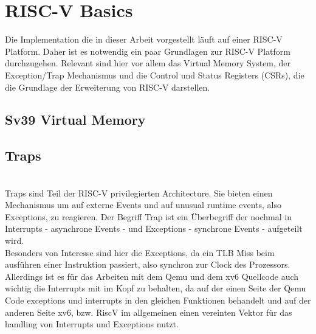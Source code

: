 



\section{RISC-V Basics}
Die Implementation die in dieser Arbeit vorgestellt läuft auf einer RISC-V Platform. Daher ist
es notwendig ein paar Grundlagen zur RISC-V Platform durchzugehen. Relevant sind hier vor allem
das Virtual Memory System, der Exception/Trap Mechanismus und die Control und Status Registers (CSRs), die
die Grundlage der Erweiterung von RISC-V darstellen.

\subsection{Sv39 Virtual Memory}

\subsection{Traps}
\\
Traps sind Teil der RISC-V privilegierten Architecture. Sie bieten einen Mechanismus
um auf externe Events und auf unusual runtime events, also Exceptions, zu reagieren\cite{riscvreader}.
Der Begriff Trap ist ein Überbegriff der nochmal in Interrupts - asynchrone Events - und
Exceptions - synchrone Events - aufgeteilt wird.\\
Besonders von Interesse sind hier die Exceptions, da ein TLB Miss beim ausführen einer Instruktion
passiert, also synchron zur Clock des Prozessors. Allerdings ist es für das Arbeiten mit
dem Qemu und dem xv6 Quellcode auch wichtig die Interrupts mit im Kopf zu behalten, da auf der
einen Seite der Qemu Code exceptions und interrupts in den gleichen Funktionen behandelt und
auf der anderen Seite xv6, bzw. RiscV im allgemeinen einen vereinten Vektor für das handling
von Interrupts und Exceptions nutzt\cite{RISCVInstructionSet}. \\

